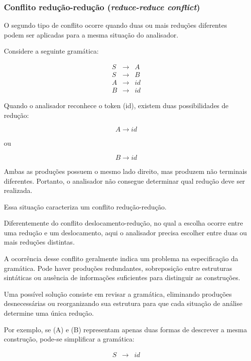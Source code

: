 \documentclass[
  brazilian,
  letterpaper,
]{book}
\theoremstyle{plain}
\theoremstyle{definition}
\theoremstyle{remark}
\begin{document}
\subsubsection{\texorpdfstring{Conflito redução-redução
(\emph{reduce-reduce
conflict})}{Conflito redução-redução (reduce-reduce conflict)}}\label{conflito-reduuxe7uxe3o-reduuxe7uxe3o-reduce-reduce-conflict}

O segundo tipo de conflito ocorre quando duas ou mais reduções
diferentes podem ser aplicadas para a mesma situação do analisador.

Considere a seguinte gramática:

\[
\begin{array}{rcl}\
S &\rightarrow& A\\\
S &\rightarrow& B\\\
A &\rightarrow& id\\\
B &\rightarrow& id\
\end{array}
\]

Quando o analisador reconhece o token (id), existem duas possibilidades
de redução:

\[
A\rightarrow id
\]

ou

\[
B\rightarrow id
\]

Ambas as produções possuem o mesmo lado direito, mas produzem não
terminais diferentes. Portanto, o analisador não consegue determinar
qual redução deve ser realizada.

Essa situação caracteriza um conflito redução-redução.

Diferentemente do conflito deslocamento-redução, no qual a escolha
ocorre entre uma redução e um deslocamento, aqui o analisador precisa
escolher entre duas ou mais reduções distintas.

A ocorrência desse conflito geralmente indica um problema na
especificação da gramática. Pode haver produções redundantes,
sobreposição entre estruturas sintáticas ou ausência de informações
suficientes para distinguir as construções.

Uma possível solução consiste em revisar a gramática, eliminando
produções desnecessárias ou reorganizando sua estrutura para que cada
situação de análise determine uma única redução.

Por exemplo, se (A) e (B) representam apenas duas formas de descrever a
mesma construção, pode-se simplificar a gramática:

\[
\begin{array}{rcl}\
S &\rightarrow& id\
\end{array}
\]
\end{document}

